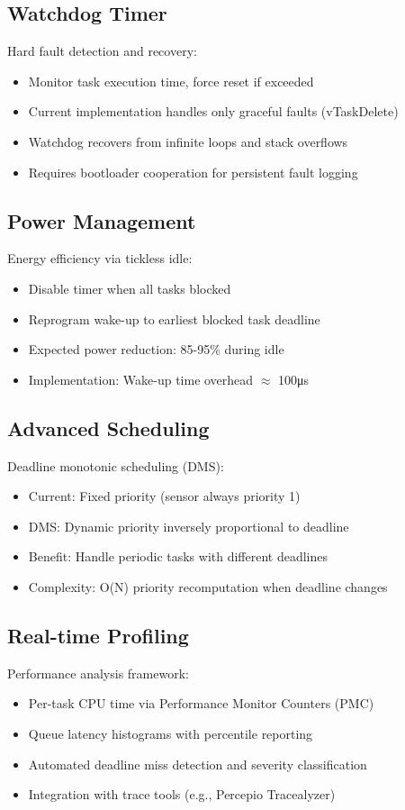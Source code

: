 \documentclass[conference]{IEEEtran}
\begin{document}
\subsection{Watchdog Timer}
Hard fault detection and recovery:
\begin{itemize}
    \item Monitor task execution time, force reset if exceeded
    \item Current implementation handles only graceful faults (vTaskDelete)
    \item Watchdog recovers from infinite loops and stack overflows
    \item Requires bootloader cooperation for persistent fault logging
\end{itemize}

\subsection{Power Management}
Energy efficiency via tickless idle:
\begin{itemize}
    \item Disable timer when all tasks blocked
    \item Reprogram wake-up to earliest blocked task deadline
    \item Expected power reduction: 85-95\% during idle
    \item Implementation: Wake-up time overhead \(\approx\) 100μs
\end{itemize}

\subsection{Advanced Scheduling}
Deadline monotonic scheduling (DMS):
\begin{itemize}
    \item Current: Fixed priority (sensor always priority 1)
    \item DMS: Dynamic priority inversely proportional to deadline
    \item Benefit: Handle periodic tasks with different deadlines
    \item Complexity: O(N) priority recomputation when deadline changes
\end{itemize}

\subsection{Real-time Profiling}
Performance analysis framework:
\begin{itemize}
    \item Per-task CPU time via Performance Monitor Counters (PMC)
    \item Queue latency histograms with percentile reporting
    \item Automated deadline miss detection and severity classification
    \item Integration with trace tools (e.g., Percepio Tracealyzer)
\end{itemize}
\end{document}
